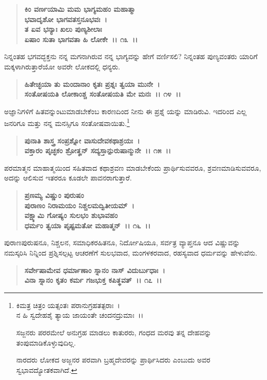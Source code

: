 \begin{verse}
\textbf{ಕಿಂ ವರ್ಣಯಾಮಿ ಮಮ ಭಾಗ್ಯಮಹಂ ಮಹಾತ್ಮಾ}\\\textbf{ಭವಾದೃಶೋ ಭಾಗವತಸ್ತನೂಭವಃ~।}\\\textbf{ತ ಏವ ಭನ್ಯಾಃ ಖಲು ಪುಣ್ಯಶೀಲಾಃ}\\\textbf{ಏಷಾಂ ಸುತಾ ಭಾಗವತಾ ಹಿ ಲೋಕೇ~।। ೧೩~।।}
\end{verse}

ನಿನ್ನಂತಹ ಭಗವದ್ಭಕ್ತನು ನನ್ನ ಮಗನಾಗಿರುವ ನನ್ನ ಭಾಗ್ಯವನ್ನು ಹೇಗೆ ವರ್ಣಿಸಲಿ? ನಿನ್ನಂತಹ ಪುಣ್ಯವಂತರು ಯಾರಿಗೆ ಮಕ್ಕಳಾಗಿರುತ್ತಾರೆಯೋ ಅವರೇ ಲೋಕದಲ್ಲಿ ಧನ್ಯರು.

\begin{verse}
\textbf{ಹಿತೇಚ್ಛಯಾ ತು ಮಂದಾನಾಂ ಕೃತಃ ಪ್ರಶ್ನಃ ತ್ವಯಾ ಮುನೇ~।}\\\textbf{ಸಂತೋಷಯತಿ ಲೋಕಾಂಶ್ಚ ಸಂತೋಷಯತಿ ಮೇ ಮನಃ~।। ೧೪~।।}
\end{verse}

ಅಜ್ಞಾನಿಗಳಿಗೆ ಹಿತವನ್ನುಂಟುಮಾಡಬೇಕೆಂಬ ಕಾರಣದಿಂದ ನೀನು ಈ ಪ್ರಶ್ನೆ ಯನ್ನು ಮಾಡಿರುವಿ. ಇದರಿಂದ ಎಲ್ಲ ಜನರಿಗೂ ಮತ್ತು ನನ್ನ ಮನಸ್ಸಿಗೂ ಸಂತೋಷವಾಯಿತು.\footnote{\phantom{*} ಕಿಮತ್ರ ಚಿತ್ರಂ ಯತ್ಸಂತಃ ಪರಾನುಗ್ರಹತತ್ಪರಾಃ~।\\ ನ ಹಿ ಸ್ವದೇಹಶೈ ತ್ಯಾಯ ಜಾಯಂತೇ ಚಂದನದ್ರುಮಾಃ~।।

ಸಜ್ಜನರು ಪರರಮೇಲೆ ಅನುಗ್ರಹ ಮಾಡಲು ಕಾತುರರು, ಗಂಧದ ಮರವು ತನ್ನ ದೇಹವನ್ನು ತಂಪುಮಾಡಿಕೊಳ್ಳುವು\-ದಿಲ್ಲ.

ನಾರದರು ಲೋಕದ ಅಜ್ಜನರ ಪರವಾಗಿ ಬ್ರಹ್ಮದೇವರನ್ನು ಪ್ರಾರ್ಥಿಸಿದರು ಎಂಬುದು ಅವರ ಸ್ವಭಾವದ್ಯೋತಕ\-ವಾಗಿದೆ.}

\begin{verse}
\textbf{ಪುನಾತಿ ಶಾಸ್ತ್ರ ಸಂಪ್ರಶ್ನೋ ವಾಸುದೇವಕಥಾಶ್ರಯಃ~।}\\\textbf{ವಕ್ತಾರಂ ಪೃಚ್ಛಕಂ ಶ್ರೋತೄನ್ ಸದ್ಯಸ್ತಾನ್ಪುರುಷಾನ್ಮುನೇ~।। ೧೫~।।}
\end{verse}

ಪರಮಾತ್ಮನ ಮಾಹಾತ್ಮಯಿಂದ ಸಹಿತವಾದ ಕಥಾಶ್ರವಣ ಮಾಡಬೇಕೆಂದು ಪ್ರಾರ್ಥಿಸು\-ವವರೂ, ಶ್ರವಣಮಾಡಿಸುವವರೂ, ಅದನ್ನು ಆಲಿಸುವ ಇತರರೂ ಕೂಡಲೇ ಪಾವನ\-ರಾಗುತ್ತಾರೆ.

\begin{verse}
\textbf{ಪ್ರಣಮ್ಯ ವಿಷ್ಣುಂ ಪುರುಷಂ} \\\textbf{ಪುರಾಣಂ ನಿರಾಮಯಂ ನಿಶ್ಚಲಮದ್ವಿತೀಯಮ್~।}\\\textbf{ವಕ್ಷ್ಯಾಮಿ ಗೋಷ್ಯಂ ಸುಲಭಂ ಶುಭಾವಹಂ}\\\textbf{ಧರ್ಮಂ ತ್ವಯಾ ಪೃಷ್ಟಮತೋ ಮಹಾತ್ಮನ್~।। ೧೬~।।}
\end{verse}

ಪುರಾಣಪುರುಷನೂ, ನಿಶ್ಚಲನ, ಸಮಾಧಿಕರಹಿತನೂ, ನಿರ್ದೋಷಿಯೂ, ಸರ್ವತ್ರ ವ್ಯಾಪ್ತನೂ ಆದ ವಿಷ್ಣುವನ್ನು ನಮಸ್ಕರಿಸಿ ನಿನ್ನಿಂದ ಪ್ರಶ್ನಿಸಲ್ಪಟ್ಟ ಆಚರಣೆಗೆ ಸುಲಭವಾದ, ಮಂಗಳಕರವಾದ, ರಹಸ್ಯವಾದ ಧರ್ಮವನ್ನು ಹೇಳುವೆನು.

\begin{verse}
\textbf{ಸರ್ವೇಷಾಮೇವ ಧರ್ಮಾಣಾಂ ಸ್ನಾನಂ ನಾಸ್‌ ವಿದುರ್ಬುಧಾಃ~।}\\\textbf{ವಿನಾ ಸ್ನಾನಂ ಕೃತಂ ಕರ್ಮ ಗಜಭುಕ್ತ ಕಪಿತ್ಥವತ್~।। ೧೭~।।}
\end{verse}


